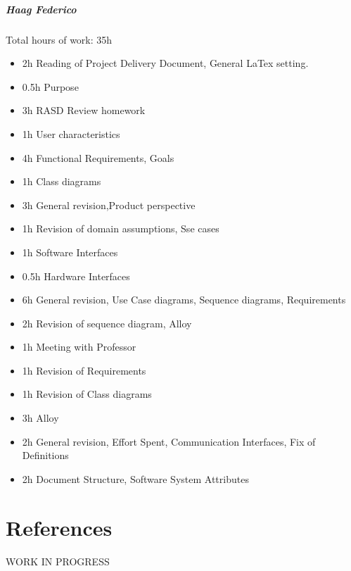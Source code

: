 \documentclass{report}
\begin{document}
		\paragraph{Haag Federico} Total hours of work: 35h
			\begin{itemize}
				\item 2h Reading of Project Delivery Document, General LaTex setting.
				\item 0.5h Purpose
				\item 3h RASD Review homework
				\item 1h User characteristics
				\item 4h Functional Requirements, Goals
				\item 1h Class diagrams
				\item 3h General revision,Product perspective
				\item 1h Revision of domain assumptions, Sse cases
				\item 1h Software Interfaces
				\item 0.5h Hardware Interfaces
				\item 6h General revision, Use Case diagrams, Sequence diagrams, Requirements
				\item 2h Revision of sequence diagram, Alloy
				\item 1h Meeting with Professor
				\item 1h Revision of Requirements
				\item 1h Revision of Class diagrams
				\item 3h Alloy
				\item 2h General revision, Effort Spent, Communication Interfaces, Fix of Definitions
				\item 2h Document Structure, Software System Attributes
			\end{itemize}
	\chapter{References}
	\thispagestyle{fancy}
	WORK IN PROGRESS
	
\end{document}
